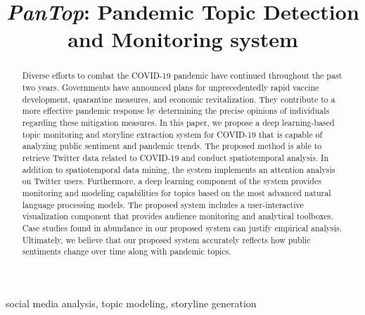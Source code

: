 \documentclass[conference]{IEEEtran}
\begin{document}
\title{{\it PanTop}: Pandemic Topic Detection and Monitoring system}

\author{
}

\maketitle

\begin{abstract} 
Diverse efforts to combat the COVID-19 pandemic have continued throughout the
past two years. Governments have announced plans for unprecedentedly rapid
vaccine development, quarantine measures, and economic revitalization. They
contribute to a more effective pandemic response by determining the precise
opinions of individuals regarding these mitigation measures. In this paper,
we propose a deep learning-based topic monitoring and storyline extraction
system for COVID-19 that is capable of analyzing public sentiment and
pandemic trends. The proposed method is able to retrieve Twitter data related
to COVID-19 and conduct spatiotemporal analysis. In addition to
spatiotemporal data mining, the system implements an attention analysis on
Twitter users. Furthermore, a deep learning component of the system provides
monitoring and modeling capabilities for topics based on the most advanced
natural language processing models. The proposed system includes a
user-interactive visualization component that provides audience monitoring
and analytical toolboxes. Case studies found in abundance in our proposed
system can justify empirical analysis. Ultimately, we believe that our
proposed system accurately reflects how public sentiments change over time
along with pandemic topics. 
\end{abstract}

\begin{IEEEkeywords}
social media analysis, topic modeling, storyline generation
\end{IEEEkeywords}


% 







\end{document}

